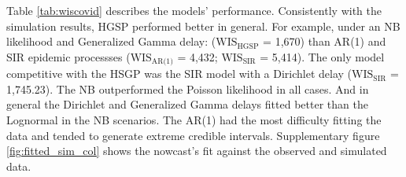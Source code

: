 \documentclass[12pt]{article}
\begin{document}
Table \ref{tab:wiscovid} describes the models' performance. Consistently with the simulation results, HGSP performed better in general. For example, under an NB likelihood and Generalized Gamma delay: ($\text{WIS}_{\text{HGSP}}$ = 1,670) than AR(1) and SIR epidemic processses ($\text{WIS}_{\text{AR(1)}}$ =  4,432; $\text{WIS}_{\text{SIR}}$ = 5,414). The only model competitive with the HSGP was the SIR model with a Dirichlet delay ($\text{WIS}_{\text{SIR}}$ = 1,745.23). The NB outperformed the Poisson likelihood in all cases. And in general the Dirichlet and Generalized Gamma delays fitted better than the Lognormal in the NB scenarios. The AR(1) had the most difficulty fitting the data and tended to generate  extreme credible intervals. Supplementary figure \ref{fig:fitted_sim_col} shows the nowcast's fit against the observed and simulated data. 
\end{document}
